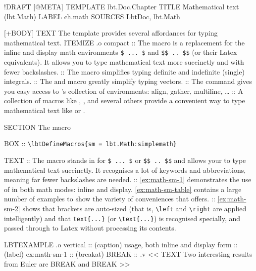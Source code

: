 \begin{lbt}
  !DRAFT
  [@META]
    TEMPLATE lbt.Doc.Chapter
    TITLE Mathematical text \textsf{(lbt.Math)}
    LABEL ch.math
    SOURCES LbtDoc, lbt.Math

  [+BODY]
    TEXT The  template provides several affordances for typing mathematical text.
    ITEMIZE .o compact
    :: The  macro is a replacement for the inline and display math environments \Verb|$ ... $| and \Verb|$$ .. $$| (or their Latex equivalents). It allows you to type mathematical text more succinctly and with fewer backslashes.
    :: The  macro simplifies typing definite and indefinite (single) integrals.
    :: The  and  macro greatly simplify typing vectors.
    :: The  command gives you easy access to 's collection of environments: align, gather, multiline, \dots
    :: A collection of macros like , ,  and several others provide a convenient way to type mathematical text like  or .

    SECTION The  macro

    BOX :: \verb|\lbtDefineMacros{sm = lbt.Math:simplemath}|

    TEXT
    :: The  macro stands in for \Verb|$ ... $| or \Verb|$$ .. $$| and allows your to type mathematical text succinctly. It recognises a lot of keywords and abbreviations, meaning far fewer backslashes are needed.
    :: \cref{ex:math-sm-1} demonstrates the use of  in both math modes: inline and display. \cref{ex:math-sm-table} contains a large number of examples to show the variety of conveniences that  offers.
    :: \cref{ex:math-sm-2} shows that brackets are auto-sized (that is, \Verb|\left| and \Verb|\right| are applied intelligently) and that \Verb|text{...}| (or \Verb|\text{...}|) is recognised specially, and passed through to Latex without processing its contents.

    LBTEXAMPLE .o vertical
    :: (caption)  usage, both inline and display form
    :: (label) ex:math-sm-1
    :: (breakat) BREAK
    :: .v <<
      TEXT Two interesting results from Euler are BREAK  and BREAK 
    >>


\end{lbt}
